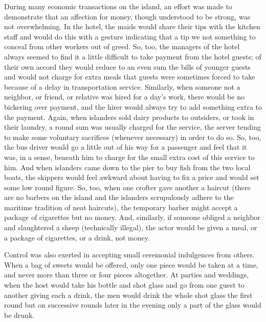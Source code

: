 \documentclass[openany,nobib]{tufte-book}
\begin{document}
During many economic transactions on the island, an effort was made to
demonstrate that an affection for money, though understood to be strong,
was not overwhelming. In the hotel, the maids would share their tips
with the kitchen staff and would do this with a gesture indicating that
a tip we not something to conceal from other workers out of greed. So,
too, the managers of the hotel always seemed to find it a little
difficult to take payment from the hotel guests; of their own accord
they would reduce to an even sum the bills of younger guests and would
not charge for extra meals that guests were sometimes forced to take
because of a delay in transportation service. Similarly, when someone
not a neighbor, or friend, or relative was hired for a day's work, there
would be no bickering over payment, and the hirer would always try to
add something extra to the payment. Again, when islanders sold dairy
products to outsiders, or took in their laundry, a round sum was usually
charged for the service, the server tending to make some voluntary
sacrifices (whenever necessary) in order to do so. So, too, the bus
driver would go a little out of his way for a passenger and feel that it
was, in a sense, beneath him to charge for the small extra cost of this
service to him. And when islanders came down to the pier to buy fish
from the two local boats, the skippers would feel awkward about having
to fix a price and would set some low round figure. So, too, when one
crofter gave another a haircut (there are no barbers on the island and
the islanders scrupulously adhere to the maritime tradition of neat
haircuts), the temporary barber might accept a package of cigarettes but
no money. And, similarly, if someone obliged a neighbor and slaughtered
a sheep (technically illegal), the actor would be given a meal, or a
package of cigarettes, or a drink, not money.

Control was also exerted in accepting small ceremonial indulgences from
others. When a bag of sweets would be offered, only one piece would be
taken at a time, and never more than three or four pieces altogether. At
parties and weddings, when the host would take his bottle and shot glass
and go from one guest to another giving each a drink, the men would
drink the whole shot glass the first round but on successive rounds
later in the evening only a part of the glass would be drunk.
\end{document}

